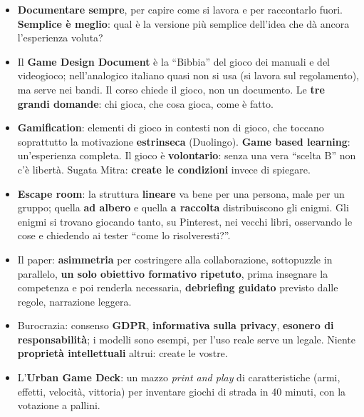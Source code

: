\begin{itemize}
        ciò che si scarta non è mai buttato.
  \item \textbf{Documentare sempre}, per capire come si lavora e per raccontarlo
        fuori. \textbf{Semplice è meglio}: qual è la versione più semplice dell'idea
        che dà ancora l'esperienza voluta?
  \item Il \textbf{Game Design Document} è la ``Bibbia'' del gioco dei manuali e del
        videogioco; nell'analogico italiano quasi non si usa (si lavora sul
        regolamento), ma serve nei bandi. Il corso chiede il gioco, non un documento.
        Le \textbf{tre grandi domande}: chi gioca, che cosa gioca, come è fatto.
  \item \textbf{Gamification}: elementi di gioco in contesti non di gioco, che
        toccano soprattutto la motivazione \textbf{estrinseca} (Duolingo). \textbf{Game based learning}:
        un'esperienza completa. Il gioco è \textbf{volontario}: senza una vera
        ``scelta B'' non c'è libertà. Sugata Mitra: \textbf{create le condizioni}
        invece di spiegare.
  \item \textbf{Escape room}: la struttura \textbf{lineare} va bene per una persona,
        male per un gruppo; quella \textbf{ad albero} e quella \textbf{a raccolta}
        distribuiscono gli enigmi. Gli enigmi si trovano giocando tanto, su Pinterest,
        nei vecchi libri, osservando le cose e chiedendo ai tester ``come lo
        risolveresti?''.
  \item Il paper: \textbf{asimmetria} per costringere alla collaborazione, sottopuzzle
        in parallelo, \textbf{un solo obiettivo formativo ripetuto}, prima insegnare la
        competenza e poi renderla necessaria, \textbf{debriefing guidato} previsto dalle
        regole, narrazione leggera.
  \item Burocrazia: consenso \textbf{GDPR}, \textbf{informativa sulla privacy},
        \textbf{esonero di responsabilità}; i modelli sono esempi, per l'uso reale
        serve un legale. Niente \textbf{proprietà intellettuali} altrui: create le
        vostre.
  \item L'\textbf{Urban Game Deck}: un mazzo \emph{print and play} di caratteristiche
        (armi, effetti, velocità, vittoria) per inventare giochi di strada in 40
        minuti, con la votazione a pallini.
\end{itemize}
